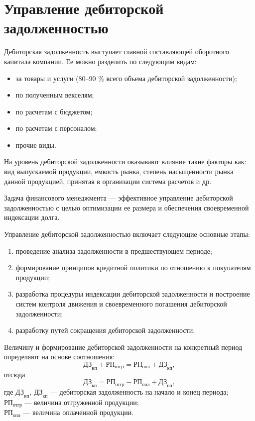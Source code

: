 \section{Управление дебиторской задолженностью}

Дебиторская задолженность выступает главной составляющей оборотного капитала компании. Ее можно разделить по следующим видам:
\begin{itemize}
	\item за товары и услуги (80--90 \% всего объема дебиторской задолженности);
	\item по полученным векселям;
	\item по расчетам с бюджетом;
	\item по расчетам с персоналом;
	\item прочие виды.
\end{itemize}

На уровень дебиторской задолженности оказывают влияние такие факторы как: вид выпускаемой продукции, емкость рынка, степень насыщенности рынка данной продукцией, принятая в организации система расчетов и др.

Задача финансового менеджмента --- эффективное управление дебиторской задолженностью с целью оптимизации ее размера и обеспечения своевременной индексации долга.

Управление дебиторской задолженностью включает следующие основные этапы:
\begin{enumerate}
	\item проведение анализа задолженности в предшествующем периоде;
	\item формирование принципов кредитной политики по отношению к покупателям продукции;
	\item разработка процедуры индексации дебиторской задолженности и построение систем контроля движения и своевременного  погашения дебиторской задолженности;
	\item разработку путей сокращения дебиторской задолженности.
\end{enumerate}

Величину и формирование дебиторской задолженности на конкретный период определяют на основе соотношения:
\[ \text{ДЗ}_\text{нп} + \text{РП}_\text{отгр} =\text{РП}_\text{опл} + \text{ДЗ}_\text{кп} , \]
отсюда
\[ \text{ДЗ}_\text{кп} = \text{РП}_\text{отгр} \minus \text{РП}_\text{опл} + \text{ДЗ}_\text{нп} , \]
где $ \text{ДЗ}_\text{нп} ,\  \text{ДЗ}_\text{кп}$ — дебиторская задолженность на начало и конец периода;\\
$\text{РП}_\text{отгр}$  — величина отгруженной продукции;\\
$\text{РП}_\text{опл}$ — величина оплаченной продукции.


